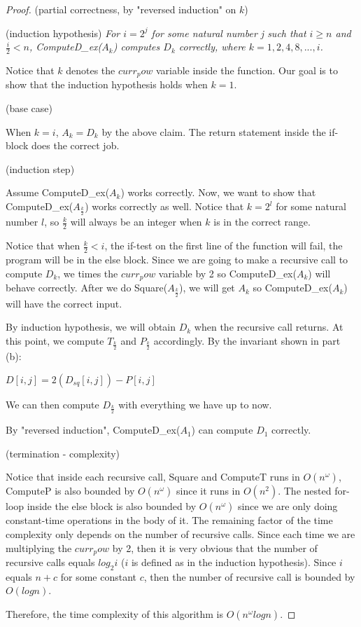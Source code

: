 \documentclass[a4paper, 10pt]{article}
\begin{document}
{\begin{proof}
(partial correctness, by "reversed induction" on $k$)

(induction hypothesis) \textit{For $i = 2^{j}$ for some natural number j such that $i \ge n$ and $\frac{i}{2} < n$, ComputeD_ex($A_k$) computes $D_k$ correctly, where $k = 1, 2, 4, 8, ..., i$.}

Notice that $k$ denotes the $curr_pow$ variable inside the function. Our goal is to show that the induction hypothesis holds when $k = 1$. 

(base case)

When $k = i$, $A_k = D_k$ by the above claim. The return statement inside the if-block does the correct job.

(induction step)

Assume ComputeD_ex($A_k$) works correctly. Now, we want to show that ComputeD_ex($A_{\frac{k}{2}}$) works correctly as well. Notice that $k = 2^{l}$ for some natural number $l$, so $\frac{k}{2}$ will always be an integer when $k$ is in the correct range.

Notice that when $\frac{k}{2} < i$, the if-test on the first line of the function will fail, the program will be in the else block. Since we are going to make a recursive call to compute $D_k$, we times the $curr_pow$ variable by 2 so ComputeD_ex($A_k$) will behave correctly. After we do Square($A_{\frac{k}{2}}$), we will get $A_k$ so ComputeD_ex($A_k$) will have the correct input.

By induction hypothesis, we will obtain $D_k$ when the recursive call returns. At this point, we compute $T_{\frac{k}{2}}$ and $P_{\frac{k}{2}}$ accordingly. By the invariant shown in part (b):

$D [i,j] = 2( D_{sq} [i,j] ) - P [i,j]$

We can then compute $D_{\frac{k}{2}}$ with everything we have up to now.

By "reversed induction", ComputeD_ex($A_1$) can compute $D_1$ correctly.

(termination - complexity)

Notice that inside each recursive call, Square and ComputeT runs in $O(n^{\omega})$, ComputeP is also bounded by $O(n^{\omega})$ since it runs in $O(n^{2})$. The nested for-loop inside the else block is also bounded by $O(n^{\omega})$ since we are only doing constant-time operations in the body of it. The remaining factor of the time complexity only depends on the number of recursive calls. Since each time we are multiplying the $curr_pow$ by 2, then it is very obvious that the number of recursive calls equals $log_2 i$ ($i$ is defined as in the induction hypothesis). Since $i$ equals $n + c$ for some constant $c$, then the number of recursive call is bounded by $O(log n)$. 

Therefore, the time complexity of this algorithm is $O(n^{\omega}log n)$.
\end{proof}

}
~\\\\
\end{document}
